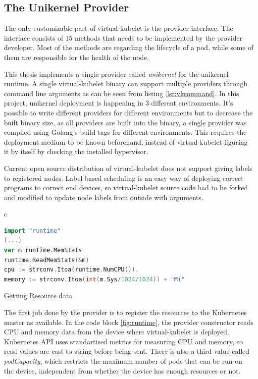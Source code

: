 \subsection{The Unikernel Provider}
The only customizable part of virtual-kubelet is the provider interface. The interface consists of 15 methods that needs to be implemented by the provider developer. Most of the methods are regarding the lifecycle of a pod, while some of them are responsible for the health of the node. 

This thesis implements a single provider called \textit{unikernel} for the unikernel runtime. A single virtual-kubelet binary can support multiple providers through command line arguments as can be seen from listing \ref{lst:vkcommand}. In this project, unikernel deployment is happening in 3 different environments. It's possible to write different providers for different environments but to decrease the built binary size, as all providers are built into the binary, a single provider was compiled using Golang's build tags for different environments. This requires the deployment medium to be known beforehand, instead of virtual-kubelet figuring it by itself by checking the installed hypervisor.

Current open source distribution of virtual-kubelet does not support giving labels to registered nodes. Label based scheduling is an easy way of deploying correct programs to correct end devices, so virtual-kubelet source code had to be forked and modified to update node labels from outside with arguments.

\begin{code}[htpb]
  \centering
  \begin{tabular}{c}
  \begin{lstlisting}[language=go]
import "runtime"
(...)
var m runtime.MemStats
runtime.ReadMemStats(&m)
cpu := strconv.Itoa(runtime.NumCPU()),
memory := strconv.Itoa(int(m.Sys/1024/1024)) + "Mi"

\end{lstlisting}
\end{tabular}
\caption{Getting Resource data}\label{fig:runtime}
\end{code}

The first job done by the provider is to register the resources to the Kubernetes master as available. In the code block \ref{fig:runtime}, the provider constructor reads CPU and memory data from the device where virtual-kubelet is deployed. Kubernetes API uses standartised metrics for measuring CPU and memory, so read values are cast to string before being sent. There is also a third value called \textit{podCapacity}, which restricts the maximum number of pods that can be run on the device, independent from whether the device has enough resources or not.

